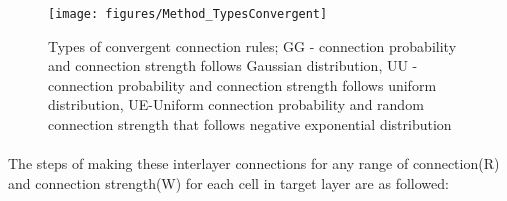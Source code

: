 \begin{figure}[!h]
	\centering
	\texttt{[image: figures/Method\_TypesConvergent]}
	\caption[Types of convergent connection rules]{Types of convergent connection rules; GG - connection probability and connection strength follows Gaussian distribution, UU - connection probability and connection strength follows uniform distribution, UE-Uniform connection probability and random connection strength that follows negative exponential distribution }
	\label{fig:ConvergentRule}
\end{figure} 

\paragraph{} The steps of making these interlayer connections for any range of connection(R) and connection strength(W) for each cell in target layer are as followed: 

